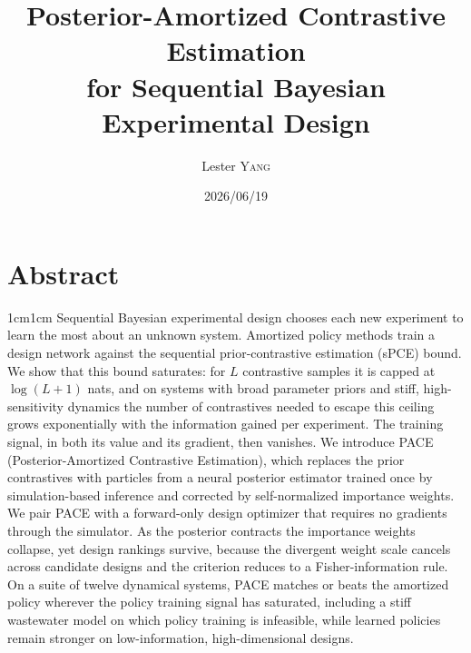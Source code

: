 \documentclass[license]{mscaithesis}  %
\title{Posterior-Amortized Contrastive Estimation\\ for Sequential Bayesian Experimental Design}
\date{2026/06/19}
\author{Lester \textsc{Yang}}
\begin{document}
\maketitle

\frontmatter
        \chapter*{Abstract}
                \begin{adjustwidth}{1cm}{1cm}
                        Sequential Bayesian experimental design chooses each new experiment to learn the most about an unknown system. Amortized policy methods train a design network against the sequential prior-contrastive estimation (sPCE) bound. We show that this bound saturates: for $L$ contrastive samples it is capped at $\log(L+1)$ nats, and on systems with broad parameter priors and stiff, high-sensitivity dynamics the number of contrastives needed to escape this ceiling grows exponentially with the information gained per experiment. The training signal, in both its value and its gradient, then vanishes. We introduce PACE (Posterior-Amortized Contrastive Estimation), which replaces the prior contrastives with particles from a neural posterior estimator trained once by simulation-based inference and corrected by self-normalized importance weights. We pair PACE with a forward-only design optimizer that requires no gradients through the simulator. As the posterior contracts the importance weights collapse, yet design rankings survive, because the divergent weight scale cancels across candidate designs and the criterion reduces to a Fisher-information rule. On a suite of twelve dynamical systems, PACE matches or beats the amortized policy wherever the policy training signal has saturated, including a stiff wastewater model on which policy training is infeasible, while learned policies remain stronger on low-information, high-dimensional designs.
                \end{adjustwidth}

\tableofcontents

\listoffigures

\listoftables

\setlength{\parskip}{5pt}




\mainmatter
        
        
        
        
        
        




\appendix
        
\end{document}
